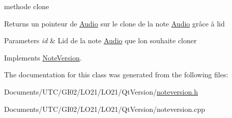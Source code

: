 methode clone 

\begin{DoxyReturn}{Returns}
un pointeur de \hyperlink{class_audio}{Audio} sur le clone de la note \hyperlink{class_audio}{Audio} grâce à l\textquotesingle{}id 
\end{DoxyReturn}

\begin{DoxyParams}{Parameters}
{\em id} & L\textquotesingle{}id de la note \hyperlink{class_audio}{Audio} que l\textquotesingle{}on souhaite cloner \\
\hline
\end{DoxyParams}


Implements \hyperlink{class_note_version_a7eb23a52291ec623b9bc1b6fe3e86c5a}{Note\+Version}.



The documentation for this class was generated from the following files\+:\begin{DoxyCompactItemize}
\item 
Documents/\+U\+T\+C/\+G\+I02/\+L\+O21/\+L\+O21/\+Qt\+Version/\hyperlink{noteversion_8h}{noteversion.\+h}\item 
Documents/\+U\+T\+C/\+G\+I02/\+L\+O21/\+L\+O21/\+Qt\+Version/noteversion.\+cpp\end{DoxyCompactItemize}
